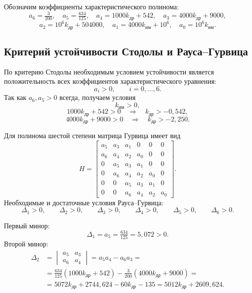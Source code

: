 \documentclass[a4paper, 14pt]{extarticle}
\begin{document}
Обозначим коэффициенты характеристического полинома:
\[
	a_6=\tfrac{3}{200},\quad a_5=\tfrac{634}{125},\quad a_4=1000k_\text{др}+542,\quad a_3=4000k_\text{др}+9000,
\]
\[
	a_2=10^6k_\text{др}+504000,\quad
	a_1=4000k_\text{им}+10^6,\quad
	a_0=10^6k_\text{им}.
\]

\subsection{Критерий устойчивости Стодолы и Рауса--Гурвица}

По критерию Стодолы необходимым условием устойчивости является положительность всех коэффициентов характеристического уравнения:
\[
	a_i>0,\qquad i=0,\ldots,6.
\]
Так как $a_6,a_5>0$ всегда, получаем условия
\[
	k_\text{им}>0,
\]
\[
	1000k_\text{др}+542>0\quad\Rightarrow\quad k_\text{др}>-0{,}542,
\]
\[
	4000k_\text{др}+9000>0\quad\Rightarrow\quad k_\text{др}>-2{,}250.
\]

Для полинома шестой степени матрица Гурвица имеет вид
\[
	H=
	\begin{bmatrix}
		a_5 & a_3 & a_1 & 0   & 0   & 0   \\
		a_6 & a_4 & a_2 & a_0 & 0   & 0   \\
		0   & a_5 & a_3 & a_1 & 0   & 0   \\
		0   & a_6 & a_4 & a_2 & a_0 & 0   \\
		0   & 0   & a_5 & a_3 & a_1 & 0   \\
		0   & 0   & a_6 & a_4 & a_2 & a_0
	\end{bmatrix}.
\]
Необходимые и достаточные условия Рауса--Гурвица:
\[
	\Delta_1>0,\qquad \Delta_2>0,\qquad \Delta_3>0,\qquad
	\Delta_4>0,\qquad \Delta_5>0,\qquad \Delta_6>0.
\]

Первый минор:
\[
	\Delta_1=a_5=\tfrac{634}{125}=5{,}072>0.
\]
Второй минор:
\[
	\begin{aligned}
		\Delta_2 & =
		\begin{vmatrix}
			a_5 & a_3 \\
			a_6 & a_4
		\end{vmatrix}
		= a_5a_4 - a_6a_3 =                                                                             \\
		         & = \tfrac{634}{125}(1000k_\text{др}+542) - \tfrac{3}{200}(4000k_\text{др}+9000) =     \\
		         & = 5072k_\text{др} + 2744{,}624 - 60k_\text{др} - 135 = 5012k_\text{др} + 2609{,}624.
	\end{aligned}
\]
\end{document}
